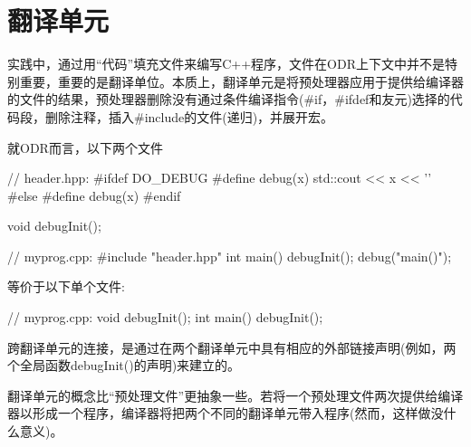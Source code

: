 \section{翻译单元}
实践中，通过用“代码”填充文件来编写C++程序，文件在ODR上下文中并不是特别重要，重要的是翻译单位。本质上，翻译单元是将预处理器应用于提供给编译器的文件的结果，预处理器删除没有通过条件编译指令(\#if，\#ifdef和友元)选择的代码段，删除注释，插入\#include的文件(递归)，并展开宏。

就ODR而言，以下两个文件

\begin{cpp}
// header.hpp:
#ifdef DO_DEBUG
#define debug(x) std::cout << x << '\n'
#else
#define debug(x)
#endif

void debugInit();

// myprog.cpp:
#include "header.hpp"
int main()
{
	debugInit();
	debug("main()");
}
\end{cpp}

等价于以下单个文件:

\begin{cpp}
// myprog.cpp:
void debugInit();
int main()
{
	debugInit();
}
\end{cpp}

跨翻译单元的连接，是通过在两个翻译单元中具有相应的外部链接声明(例如，两个全局函数debugInit()的声明)来建立的。

翻译单元的概念比“预处理文件”更抽象一些。若将一个预处理文件两次提供给编译器以形成一个程序，编译器将把两个不同的翻译单元带入程序(然而，这样做没什么意义)。









































